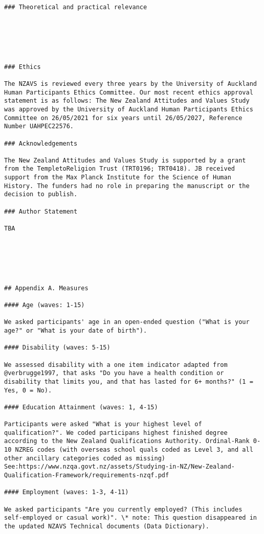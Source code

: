 \documentclass[
  singlecolumn]{article}
\begin{document}
\begin{verbatim}
### Theoretical and practical relevance






### Ethics

The NZAVS is reviewed every three years by the University of Auckland Human Participants Ethics Committee. Our most recent ethics approval statement is as follows: The New Zealand Attitudes and Values Study was approved by the University of Auckland Human Participants Ethics Committee on 26/05/2021 for six years until 26/05/2027, Reference Number UAHPEC22576.

### Acknowledgements

The New Zealand Attitudes and Values Study is supported by a grant from the TempletoReligion Trust (TRT0196; TRT0418). JB received support from the Max Planck Institute for the Science of Human History. The funders had no role in preparing the manuscript or the decision to publish.

### Author Statement

TBA






## Appendix A. Measures

#### Age (waves: 1-15)

We asked participants' age in an open-ended question ("What is your age?" or "What is your date of birth").

#### Disability (waves: 5-15)

We assessed disability with a one item indicator adapted from @verbrugge1997, that asks "Do you have a health condition or disability that limits you, and that has lasted for 6+ months?" (1 = Yes, 0 = No).

#### Education Attainment (waves: 1, 4-15)

Participants were asked "What is your highest level of qualification?". We coded participans highest finished degree according to the New Zealand Qualifications Authority. Ordinal-Rank 0-10 NZREG codes (with overseas school quals coded as Level 3, and all other ancillary categories coded as missing) See:https://www.nzqa.govt.nz/assets/Studying-in-NZ/New-Zealand-Qualification-Framework/requirements-nzqf.pdf

#### Employment (waves: 1-3, 4-11)

We asked participants "Are you currently employed? (This includes self-employed or casual work)". \* note: This question disappeared in the updated NZAVS Technical documents (Data Dictionary).


\end{verbatim}
\end{document}
